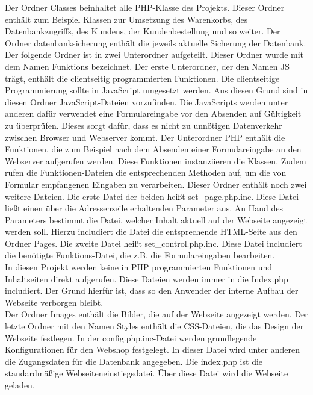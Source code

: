 Der Ordner \glqq Classes\grqq{} beinhaltet alle PHP-Klasse des Projekts. Dieser Ordner enthält zum Beispiel Klassen zur Umsetzung des Warenkorbs, des Datenbankzugriffs, des Kundens, der Kundenbestellung und so weiter. Der Ordner \glqq datenbanksicherung\grqq{} enthält die jeweils aktuelle Sicherung der Datenbank. Der folgende Ordner ist in zwei Unterordner aufgeteilt. Dieser Ordner wurde mit dem Namen \glqq Funktions\grqq{} bezeichnet. Der erste Unterordner, der den Namen \glqq JS\grqq{} trägt, enthält die clientseitig programmierten Funktionen. Die clientseitige Programmierung sollte in JavaScript umgesetzt werden. Aus diesen Grund sind in diesen Ordner JavaScript-Dateien vorzufinden. Die JavaScripts werden unter anderen dafür verwendet eine Formulareingabe vor den Absenden auf Gültigkeit zu überprüfen. Dieses sorgt dafür, dass es nicht zu unnötigen Datenverkehr zwischen Browser und Webserver kommt. Der Unterordner \glqq PHP\grqq{} enthält die Funktionen, die zum Beispiel nach dem Absenden einer Formulareingabe an den Webserver aufgerufen werden. Diese Funktionen instanziieren die Klassen. Zudem rufen die Funktionen-Dateien die entsprechenden Methoden auf, um die von Formular empfangenen Eingaben zu verarbeiten. Dieser Ordner enthält noch zwei weitere Dateien. Die erste Datei der beiden heißt \glqq set\_page.php.inc\grqq{}. Diese Datei ließt einen über die Adressenzeile erhaltenden Parameter aus. An Hand des Parameters bestimmt die Datei, welcher Inhalt aktuell auf der Webseite angezeigt werden soll. Hierzu includiert die Datei die entsprechende HTML-Seite aus den Ordner \glqq Pages\grqq{}. Die zweite Datei heißt \glqq  set\_control.php.inc\grqq{}. Diese Datei includiert die benötigte Funktions-Datei, die z.B. die Formulareingaben bearbeiten. \\
In diesen Projekt werden keine in PHP programmierten Funktionen und Inhaltseiten direkt aufgerufen. Diese Dateien werden immer in die Index.php includiert. Der Grund hierfür ist, dass so den Anwender der interne Aufbau der Webseite verborgen bleibt.\\
Der Ordner \glqq Images\grqq{} enthält die Bilder, die auf der Webseite angezeigt werden. Der letzte Ordner mit den Namen \glqq Styles\grqq{} enthält die CSS-Dateien, die das Design der Webseite festlegen. In der \glqq config.php.inc\grqq{}-Datei werden grundlegende Konfigurationen für den Webshop festgelegt. In dieser Datei wird unter anderen die Zugangsdaten für die Datenbank angegeben. Die \glqq index.php\grqq{} ist die standardmäßige Webseiteneinstiegsdatei. Über diese Datei wird die Webseite geladen.

